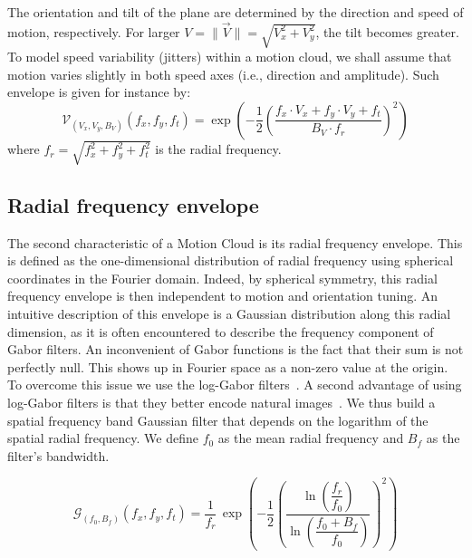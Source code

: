 \documentclass[a4paper,11pt]{article}%
\begin{document}
The orientation and tilt of the plane are determined by the direction and speed of motion, respectively. For larger $V=\| \vec{V} \|=\sqrt{V_x^2+V_y^2}$, the tilt  becomes greater. To model speed variability (jitters) within a motion cloud, we shall assume that motion  varies slightly in both speed axes (i.e., direction and amplitude). Such envelope is given for instance by: %
\begin{equation} %
\mathcal{V}_{(V_x, V_y, B_{V})}(f_{x}, f_{y}, f_{t})=\exp\left(-\dfrac{1}{2}\left( \dfrac{ f_x\cdot V_x + f_y\cdot V_y + f_t }{B_{V} \cdot f_r} \right)^{2} \right)
\label{eq:envelope_speed_plane} %
\end{equation} %
where  $ f_r = \sqrt{f_x^2 + f_y^2 + f_t^2} $ is the radial frequency.  %

\subsection{Radial frequency envelope}
The second characteristic of a Motion  Cloud is its radial frequency envelope. This is defined as the one-dimensional distribution of radial frequency using spherical coordinates in the Fourier domain. Indeed, by spherical symmetry, this radial frequency envelope is then independent to motion and orientation tuning. An intuitive description of this envelope is a Gaussian distribution along this radial dimension, as it is often encountered to describe the frequency component of Gabor filters. An inconvenient of Gabor functions is the fact that their sum is not perfectly null. This shows up in Fourier space as a non-zero value at the origin. To overcome this issue we use the log-Gabor filters~\citep{Fischer07a}. A second advantage of using log-Gabor filters is that they better encode natural images~\citep{Field87}. We thus  build a spatial frequency band Gaussian filter that depends on the logarithm of the spatial radial frequency. We define $f_0$ as the mean radial frequency and $B_{f}$ as the filter's bandwidth. %

\begin{equation}
 \mathcal{G}_{(f_0,B_{f})} (f_{x}, f_{y}, f_{t})=\dfrac{1}{f_r}\,\exp\left(-\dfrac{1}{2}\left(\dfrac{\ln\left(\dfrac{f_r}{f_0}\right)}{\ln\left(\dfrac{f_0+B_{f}}{f_0}\right)}\right)^{2}\right)
\label{eq:envelope_sphere}
\end{equation}
\end{document}
